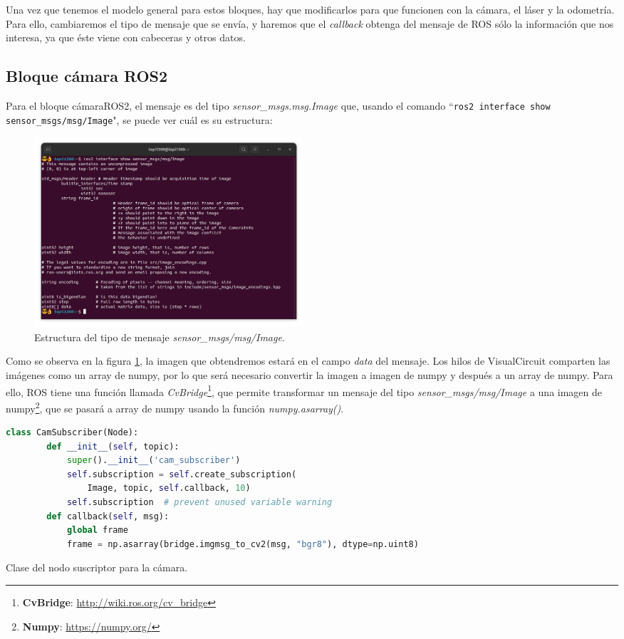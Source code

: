 Una vez que tenemos el modelo general para estos bloques, hay que modificarlos para que funcionen con la cámara, el láser y la odometría. Para ello,
cambiaremos el tipo de mensaje que se envía, y haremos que el \textit{callback} obtenga del mensaje de ROS sólo la información que nos interesa,
ya que éste viene con cabeceras y otros datos.\\
\newpage
\subsection{Bloque cámara ROS2}
\label{subsec:cameraROS2}

Para el bloque cámaraROS2, el mensaje es del tipo \textit{sensor\_msgs.msg.Image} que,
usando el comando ``\lstinline|ros2 interface show sensor_msgs/msg/Image|", se puede ver cuál es su estructura:
\begin{figure} [H]
  \begin{center}
      \includegraphics[width=10cm]{figs/c4/image_struct.png}
  \end{center}
  \caption[Estructura mensaje Image]{Estructura del tipo de mensaje \textit{sensor\_msgs/msg/Image}.}
  \label{fig:image_struct}
\end{figure}
Como se observa en la figura \ref{fig:image_struct}, la imagen que obtendremos estará en el campo \textit{data} del mensaje. Los hilos de VisualCircuit
comparten las imágenes como un array de numpy, por lo que será necesario convertir la imagen a imagen de numpy y después a un array de numpy.
Para ello, ROS tiene una función llamada \textit{CvBridge}\footnote{\textbf{CvBridge}: \url{http://wiki.ros.org/cv_bridge}}, que permite transformar un mensaje del
tipo \textit{sensor\_msgs/msg/Image} a una imagen de numpy\footnote{\textbf{Numpy}: \url{https://numpy.org/}}, que se pasará a array de numpy usando la
función \textit{numpy.asarray()}.
\begin{code}[H]
  \begin{lstlisting}[language=python]
    class CamSubscriber(Node):
        def __init__(self, topic):
            super().__init__('cam_subscriber')
            self.subscription = self.create_subscription(
                Image, topic, self.callback, 10)
            self.subscription  # prevent unused variable warning
        def callback(self, msg):
            global frame
            frame = np.asarray(bridge.imgmsg_to_cv2(msg, "bgr8"), dtype=np.uint8)
  \end{lstlisting}
  \caption[Clase del nodo suscriptor para cámara]{Clase del nodo suscriptor para la cámara.}
  \label{cod:cam_node_class}
\end{code}
